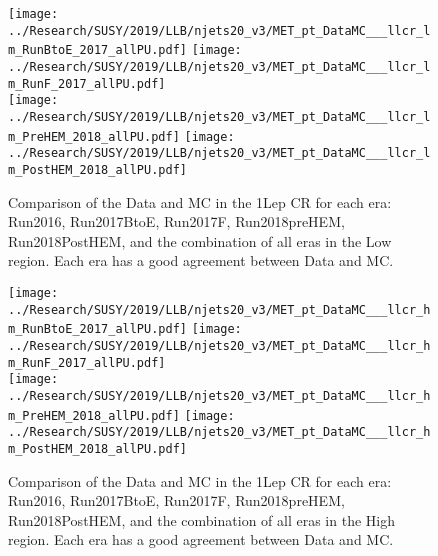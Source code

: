 \begin{figure}[!htb]
	\begin{center}
  \texttt{[image: ../Research/SUSY/2019/LLB/njets20\_v3/MET\_pt\_DataMC\_\_\_llcr\_lm\_RunBtoE\_2017\_allPU.pdf]}
  \texttt{[image: ../Research/SUSY/2019/LLB/njets20\_v3/MET\_pt\_DataMC\_\_\_llcr\_lm\_RunF\_2017\_allPU.pdf]} \\
  \texttt{[image: ../Research/SUSY/2019/LLB/njets20\_v3/MET\_pt\_DataMC\_\_\_llcr\_lm\_PreHEM\_2018\_allPU.pdf]}
  \texttt{[image: ../Research/SUSY/2019/LLB/njets20\_v3/MET\_pt\_DataMC\_\_\_llcr\_lm\_PostHEM\_2018\_allPU.pdf]} \\
	\end{center}
	\caption[Lost Lepton LM Eras ]{Comparison of the Data and MC in the 1Lep CR for each era: Run2016, Run2017BtoE, Run2017F, Run2018preHEM, Run2018PostHEM, and the combination of all eras in the Low \dm{} region. Each era has a good agreement between Data and MC. 
	 }
	\label{fig:llb-1lcr-datavsmc-lm-inclusive}
\end{figure}
\begin{figure}[!htb]
	\begin{center}  
		\texttt{[image: ../Research/SUSY/2019/LLB/njets20\_v3/MET\_pt\_DataMC\_\_\_llcr\_hm\_RunBtoE\_2017\_allPU.pdf]}
		\texttt{[image: ../Research/SUSY/2019/LLB/njets20\_v3/MET\_pt\_DataMC\_\_\_llcr\_hm\_RunF\_2017\_allPU.pdf]} \\
		\texttt{[image: ../Research/SUSY/2019/LLB/njets20\_v3/MET\_pt\_DataMC\_\_\_llcr\_hm\_PreHEM\_2018\_allPU.pdf]}
		\texttt{[image: ../Research/SUSY/2019/LLB/njets20\_v3/MET\_pt\_DataMC\_\_\_llcr\_hm\_PostHEM\_2018\_allPU.pdf]}
	\end{center}
	\caption[Lost Lepton HM Eras]{Comparison of the Data and MC in the 1Lep CR for each era: Run2016, Run2017BtoE, Run2017F, Run2018preHEM, Run2018PostHEM, and the combination of all eras in the High \dm{} region. Each era has a good agreement between Data and MC. 
	 }
	\label{fig:llb-1lcr-datavsmc-hm-inclusive}
\end{figure}
